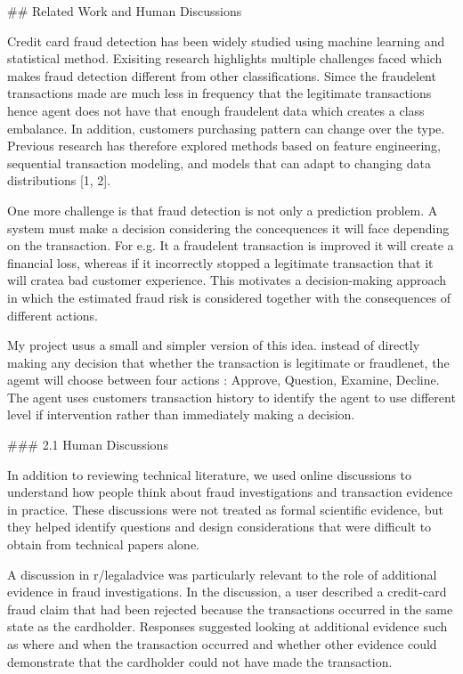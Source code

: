 ## Related Work and Human Discussions

Credit card fraud detection has been widely studied using machine learning and statistical method. Exisiting research highlights multiple challenges faced which makes fraud detection different from other classifications. Simce the fraudelent transactions made are much less in frequency that the legitimate transactions hence agent does not have that enough fraudelent data which creates a class embalance.
In addition, customers purchasing pattern can change over the type. Previous research has therefore explored methods based on feature engineering, sequential transaction modeling, and models that can adapt to changing data distributions [1, 2].

One more challenge is that fraud detection is not only a prediction problem. A system must make a decision considering the concequences it will face depending on the transaction. For e.g. It a fraudelent transaction is improved it will create a financial loss, whereas if it incorrectly stopped a legitimate transaction that it will cratea bad customer experience.
This motivates a decision-making approach in which the estimated fraud risk is considered together with the consequences of different actions. 

My project usus a small and simpler version of this idea. instead of directly making any decision that whether the transaction is legitimate or fraudlenet, the agemt will choose between four actions : Approve, Question, Examine, Decline.
The agent uses customers transaction history to identify the agent to use different level if intervention rather than immediately making a decision.

### 2.1 Human Discussions

In addition to reviewing technical literature, we used online discussions to understand how people think about fraud investigations and transaction evidence in practice. These discussions were not treated as formal scientific evidence, but they helped identify questions and design considerations that were difficult to obtain from technical papers alone.

A discussion in r/legaladvice was particularly relevant to the role of additional evidence in fraud investigations. In the discussion, a user described a credit-card fraud claim that had been rejected because the transactions occurred in the same state as the cardholder. Responses suggested looking at additional evidence such as where and when the transaction occurred and whether other evidence could demonstrate that the cardholder could not have made the transaction.

